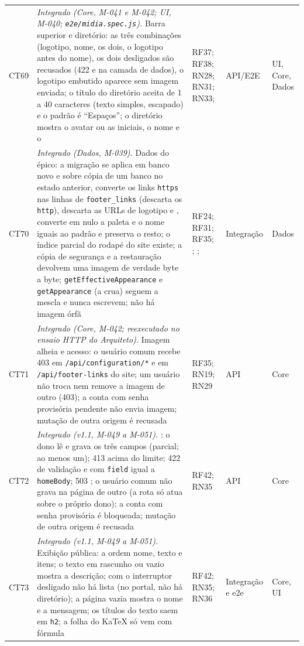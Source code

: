 \begin{longtable}{@{}L{1.1cm}L{7.0cm}L{2.2cm}L{1.6cm}L{1.6cm}@{}}
CT69 & \emph{Integrado (Core, M-041 e M-042; UI, M-040; \texttt{e2e/midia.spec.js}).} Barra superior e diretório: as três combinações (logotipo, nome, os dois, o logotipo antes do nome), os dois desligados são recusados (422 e na camada de dados), o logotipo embutido aparece sem imagem enviada; o título do diretório aceita de 1 a 40 caracteres (texto simples, escapado) e o padrão é ``Espaços''; o diretório mostra o avatar ou as iniciais, o nome e o  & RF37; RF38; RN28; RN31; RN33;  & API/E2E & UI, Core, Dados\\[2pt]
CT70 & \emph{Integrado (Dados, M-039).} Dados do épico: a migração se aplica em banco novo e sobre cópia de um banco no estado anterior, converte os links \texttt{https} nas linhas de \texttt{footer\_links} (descarta os \texttt{http}), descarta as URLs de logotipo e , converte em nulo a paleta e o nome iguais ao padrão e preserva o resto; o índice parcial do rodapé do site existe; a cópia de segurança e a restauração devolvem uma imagem de verdade byte a byte; \texttt{getEffectiveAppearance} e \texttt{getAppearance} (a crua) seguem a mescla e nunca escrevem; não há imagem órfã & RF24; RF31; RF35; ; ;  & Integração & Dados\\[2pt]
CT71 & \emph{Integrado (Core, M-042; reexecutado no ensaio HTTP do Arquiteto).} Imagem alheia e acesso: o usuário comum recebe 403 em \texttt{/api/configuration/*} e em \texttt{/api/footer-links} do site; um usuário não troca nem remove a imagem de outro (403); a conta com senha provisória pendente não envia imagem; mutação de outra origem é recusada & RF35; RN19; RN29 & API & Core\\[2pt]
CT72 & \emph{Integrado (v1.1, M-049 a M-051).} : o dono lê e grava os três campos (parcial; ao menos um); 413 acima do limite; 422 de validação e  com \texttt{field} igual a \texttt{homeBody}; 503 ; o usuário comum não grava na página de outro (a rota só atua sobre o próprio dono); a conta com senha provisória é bloqueada; mutação de outra origem é recusada & RF42; RN35 & API & Core\\[2pt]
CT73 & \emph{Integrado (v1.1, M-049 a M-051).} Exibição pública: a ordem nome, texto e itens; o texto em rascunho ou vazio mostra a descrição; com o interruptor desligado não há lista (no portal, não há diretório); a página vazia mostra o nome e a mensagem; os títulos do texto saem em \texttt{h2}; a folha do KaTeX só vem com fórmula & RF42; RN35; RN36 & Integração e e2e & Core, UI\\[2pt]

\end{longtable}
